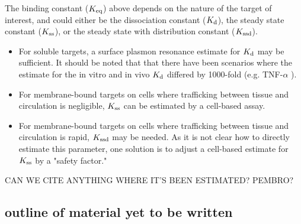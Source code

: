   The binding constant ($K_\text{eq}$) above depends on the nature of the target of interest, and could either be the dissociation constant ($K_\text{d}$), the steady state constant ($K_\text{ss}$), or the steady state with distribution constant ($K_\text{ssd}$).
\begin{itemize}
	\item For soluble targets, a surface plasmon resonance estimate for $K_\text{d}$ may be sufficient.  It should be noted that that there have been scenarios where the estimate for the in vitro and in vivo $K_\text{d}$ differed by 1000-fold (e.g. TNF-$\alpha$ \cite[Figure 8]{meno05}).
	\item For membrane-bound targets on cells where trafficking between tissue and circulation is negligible, $K_\text{ss}$ can be estimated by a cell-based assay.
	\item For membrane-bound targets on cells where trafficking between tissue and circulation is rapid, $K_\text{ssd}$ may be needed.  As it is not clear how to directly estimate this parameter, one solution is to adjust a cell-based estimate for $K_\text{ss}$ by a "safety factor."
\end{itemize}
CAN WE CITE ANYTHING WHERE IT'S BEEN ESTIMATED?  PEMBRO? 


\subsection{outline of material yet to be written}

